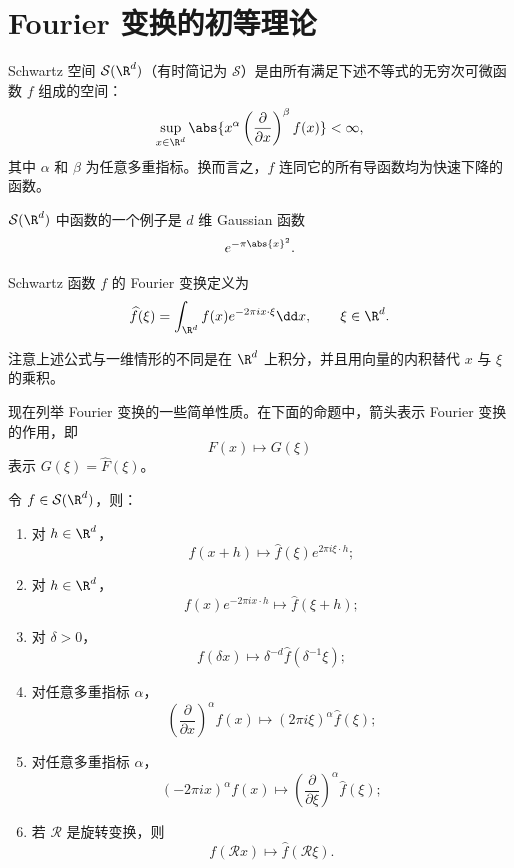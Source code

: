 \section{Fourier 变换的初等理论}

\begin{definition}
	Schwartz 空间 $\mathcal S(\R^d)$（有时简记为 $\mathcal S$）是由所有满足下述不等式的无穷次可微函数 $f$ 组成的空间：
	\[
	\sup_{x\in\R^d}
	\abs{x^\alpha
	\left(\frac{\partial}{\partial x}\right)^\beta f(x)}
	<\infty,
	\]
	其中 $\alpha$ 和 $\beta$ 为任意多重指标。换而言之，$f$ 连同它的所有导函数均为快速下降的函数。
\end{definition}

\begin{example}
	$\mathcal S(\R^d)$ 中函数的一个例子是 $d$ 维 Gaussian 函数
	\[
	e^{-\pi\abs{x}^2}.
	\]

\end{example}

\begin{definition}
	Schwartz 函数 $f$ 的 Fourier 变换定义为
\[
\widehat f(\xi)
=\int_{\R^d}f(x)e^{-2\pi i x\cdot\xi}\dd x,
\qquad \xi\in\R^d.
\]
\end{definition}
注意上述公式与一维情形的不同是在 $\R^d$ 上积分，并且用向量的内积替代 $x$ 与 $\xi$ 的乘积。

现在列举 Fourier 变换的一些简单性质。在下面的命题中，箭头表示 Fourier 变换的作用，即
\[
F(x)\longmapsto G(\xi)
\]
表示 $G(\xi)=\widehat F(\xi)$。

\begin{proposition}\label{prop:fourier-properties-Rd}
	令 $f\in\mathcal S(\R^d)$，则：
	\begin{enumerate}[label=(\roman*)]
		\item 对 $h\in\R^d$，
		\[
		f(x+h)\longmapsto
		\widehat f(\xi)e^{2\pi i\xi\cdot h};
		\]

		\item 对 $h\in\R^d$，
		\[
		f(x)e^{-2\pi i x\cdot h}
		\longmapsto\widehat f(\xi+h);
		\]

		\item 对 $\delta>0$，
		\[
		f(\delta x)\longmapsto
		\delta^{-d}\widehat f(\delta^{-1}\xi);
		\]

		\item 对任意多重指标 $\alpha$，
		\[
		\left(\frac{\partial}{\partial x}\right)^\alpha f(x)
		\longmapsto
		(2\pi i\xi)^\alpha\widehat f(\xi);
		\]

		\item 对任意多重指标 $\alpha$，
		\[
		(-2\pi i x)^\alpha f(x)
		\longmapsto
		\left(\frac{\partial}{\partial\xi}\right)^\alpha
		\widehat f(\xi);
		\]

		\item 若 $\mathcal{R}$ 是旋转变换，则
		\[
		f(\mathcal{R}x)\longmapsto\widehat f(\mathcal{R}\xi).
		\]
	\end{enumerate}
\end{proposition}

